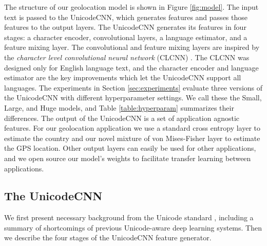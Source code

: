 \documentclass[sigconf,anonymous,review]{acmart}
\renewcommand{\times}{\mathbin{\tikz [x=1.4ex,y=1.4ex,line width=.1ex] \draw (0,0) -- (1,1) (0,1) -- (1,0);}}%
\newcommand{\defn}[1]{\textit{#1}}
\begin{document}
The structure of our geolocation model is shown in Figure \ref{fig:model}.
The input text is passed to the UnicodeCNN,
which generates features and passes those features to the output layers.
The UnicodeCNN generates its features in four stages:
a character encoder,
convolutional layers,
a language estimator,
and a feature mixing layer.
The convolutional and feature mixing layers are inspired by the \defn{character level convolutional neural network} (CLCNN) \citep{zhang2015character}.
The CLCNN was designed only for English language text,
and the character encoder and language estimator are the key improvements which let the UnicodeCNN support all languages.
The experiments in Section \ref{sec:experiments} evaluate three versions of the UnicodeCNN with different hyperparameter settings.
We call these the Small, Large, and Huge models,
and Table \ref{table:hyperparam} summarizes their differences.
The output of the UnicodeCNN is a set of application agnostic features.
For our geolocation application we use a standard cross entropy layer to estimate the country and our novel mixture of von Mises-Fisher layer to estimate the GPS location.
Other output layers can easily be used for other applications,
and we open source our model's weights to facilitate transfer learning between applications. %

\subsection{The UnicodeCNN}

We first present necessary background from the Unicode standard \citep{Unicode},
including a summary of shortcomings of previous Unicode-aware deep learning systems.
Then we describe the four stages of the UnicodeCNN feature generator.
\end{document}
